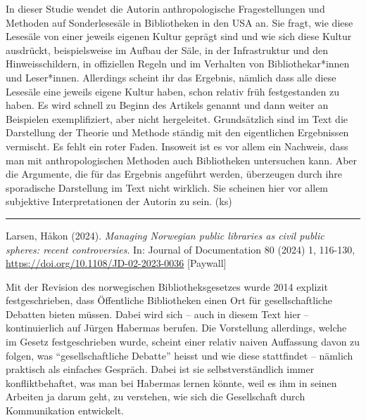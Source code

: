 \documentclass[a4paper,
fontsize=11pt,
oneside,
numbers=noperiodatend,
parskip=half-,
bibliography=totoc,
final
]{scrartcl}
\begin{document}
In dieser Studie wendet die Autorin anthropologische Fragestellungen und
Methoden auf Sonderlesesäle in Bibliotheken in den USA an. Sie fragt,
wie diese Lesesäle von einer jeweils eigenen Kultur geprägt sind und wie
sich diese Kultur ausdrückt, beispielsweise im Aufbau der Säle, in der
Infrastruktur und den Hinweisschildern, in offiziellen Regeln und im
Verhalten von Bibliothekar*innen und Leser*innen. Allerdings scheint ihr
das Ergebnis, nämlich dass alle diese Lesesäle eine jeweils eigene
Kultur haben, schon relativ früh festgestanden zu haben. Es wird schnell
zu Beginn des Artikels genannt und dann weiter an Beispielen
exemplifiziert, aber nicht hergeleitet. Grundsätzlich sind im Text die
Darstellung der Theorie und Methode ständig mit den eigentlichen
Ergebnissen vermischt. Es fehlt ein roter Faden. Insoweit ist es vor
allem ein Nachweis, dass man mit anthropologischen Methoden auch
Bibliotheken untersuchen kann. Aber die Argumente, die für das Ergebnis
angeführt werden, überzeugen durch ihre sporadische Darstellung im Text
nicht wirklich. Sie scheinen hier vor allem subjektive Interpretationen
der Autorin zu sein. (ks)

\begin{center}\rule{0.5\linewidth}{0.5pt}\end{center}

Larsen, Håkon (2024). \emph{Managing Norwegian public libraries as civil
public spheres: recent controversies}. In: Journal of Documentation 80
(2024) 1, 116-130, \url{https://doi.org/10.1108/JD-02-2023-0036}
{[}Paywall{]}

Mit der Revision des norwegischen Bibliotheksgesetzes wurde 2014
explizit festgeschrieben, dass Öffentliche Bibliotheken einen Ort für
gesellschaftliche Debatten bieten müssen. Dabei wird sich -- auch in
diesem Text hier -- kontinuierlich auf Jürgen Habermas berufen. Die
Vorstellung allerdings, welche im Gesetz festgeschrieben wurde, scheint
einer relativ naiven Auffassung davon zu folgen, was
\enquote{gesellschaftliche Debatte} heisst und wie diese stattfindet --
nämlich praktisch als einfaches Gespräch. Dabei ist sie
selbstverständlich immer konfliktbehaftet, was man bei Habermas lernen
könnte, weil es ihm in seinen Arbeiten ja darum geht, zu verstehen, wie
sich die Gesellschaft durch Kommunikation entwickelt.
\end{document}
